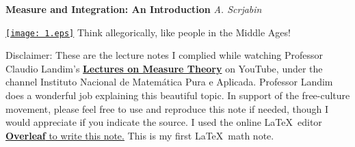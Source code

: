 \begin{titlepage}
   \begin{center}
      \LARGE\textbf{Measure and Integration: An Introduction}\medbreak
      \Large\textsl{A. Scrjabin}\bigbreak
      \end{center}
      \begin{center}
      \href{https://en.wikipedia.org/wiki/The_Five_Senses_(series)}{\texttt{[image: 1.eps]}}\newline
      Think allegorically, like people in the Middle Ages!
   \end{center}
   \tableofcontents
   \bigbreak\bigbreak
   Disclaimer: These are the lecture notes I complied while watching Professor Claudio Landim's \href{https://www.youtube.com/playlist?list=PLo4jXE-LdDTQq8ZyA8F8reSQHej3F6RFX}{\textbf{Lectures on Measure Theory}} on YouTube, under the channel Instituto Nacional de Matemática Pura e Aplicada. Professor Landim does a wonderful job explaining this beautiful topic. In support of the free-culture movement, please feel free to use and reproduce this note if needed, though I would appreciate if you indicate the source. I used the online \LaTeX\  editor \href{https://www.overleaf.com}{\textbf{Overleaf} to write this note.} This is my first \LaTeX\ math note.
\end{titlepage}